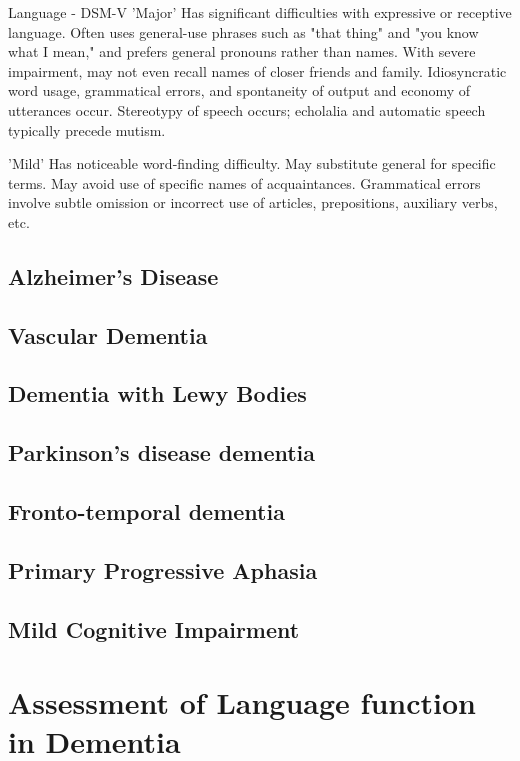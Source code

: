 \documentclass[a4paper]{article}
\begin{document}
Language - DSM-V
'Major' Has significant difficulties with expressive or receptive language. Often uses general-use phrases such as "that thing" and "you know what I mean," and prefers general pronouns rather than names. With severe impairment, may not even recall names of closer friends and family. Idiosyncratic word usage, grammatical errors, and spontaneity of output and economy of utterances occur. Stereotypy of speech occurs; echolalia and automatic speech typically precede mutism.

'Mild' Has noticeable word-finding difficulty. May substitute general for specific terms. May avoid use of specific names of acquaintances. Grammatical errors involve subtle omission or incorrect use of articles, prepositions, auxiliary verbs, etc.

\subsection{Alzheimer's Disease}
\subsection{Vascular Dementia}
\subsection{Dementia with Lewy Bodies}
\subsection{Parkinson's disease dementia}
\subsection{Fronto-temporal dementia}
\subsection{Primary Progressive Aphasia}
\subsection{Mild Cognitive Impairment}

\section{Assessment of Language function in Dementia}
\end{document}
